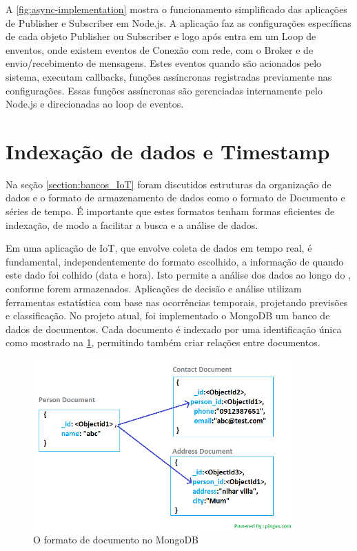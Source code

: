 A \ref{fig:async-implementation} mostra o funcionamento simplificado das aplicações de Publisher e Subscriber em Node.js. A aplicação faz as configurações específicas de cada objeto Publisher ou Subscriber e logo após entra em um Loop de enventos, onde existem eventos de Conexão com rede, com o Broker e de envio/recebimento de mensagens. Estes eventos quando são acionados pelo sistema, executam callbacks, funções assíncronas registradas previamente nas configurações. Essas funções assíncronas são gerenciadas internamente pelo Node.js e direcionadas ao loop de eventos.

\section{Indexação de dados e Timestamp}
\label{section:timestamp}

Na seção \ref{section:bancos_IoT} foram discutidos estruturas da organização de dados e o formato de armazenamento de dados como o formato de Documento e séries de tempo. É importante que estes formatos tenham formas eficientes de indexação, de modo a facilitar a busca e a análise de dados.

Em uma aplicação de IoT, que envolve coleta de dados em tempo real, é fundamental, independentemente do formato escolhido, a informação de quando este dado foi colhido (data e hora). Isto permite a análise dos dados ao longo do , conforme forem armazenados. Aplicações de decisão e análise utilizam ferramentas estatística com base nas ocorrências temporais, projetando previsões e classificação. No projeto atual, foi implementado o MongoDB um banco de dados de documentos. Cada documento é indexado por uma identificação única como mostrado na \ref{fig:document-model}, permitindo também criar relações entre documentos.

\begin{figure}[h!]
\centering
\includegraphics[width=10cm]{./02_Capitulos/02_Cap3/figures/document-model}
\caption{O formato de documento no MongoDB}
\label{fig:document-model}
\end{figure}

